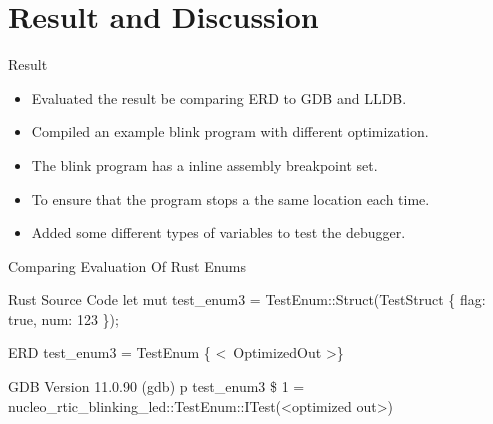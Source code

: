 \section{Result and Discussion}

\begin{frame}{Result}
    \begin{itemize}
        \item Evaluated the result be comparing ERD to GDB and LLDB.
        \item Compiled an example blink program with different optimization.
        \item The blink program has a inline assembly breakpoint set.
        \item To ensure that the program stops a the same location each time.
        \item Added some different types of  variables to test the debugger.
    \end{itemize}
\end{frame}


\begin{frame}{Comparing Evaluation Of Rust Enums}
	\begin{alertblock}{Rust Source Code}
		let mut test\_enum3 = TestEnum::Struct(TestStruct \{ flag: true, num: 123 \});
    	\end{alertblock}

	\begin{block}{ERD}
		test\_enum3 = TestEnum \{ \textless \ OptimizedOut \textgreater \}
    	\end{block}

    	\begin{block}{GDB Version 11.0.90}
		(gdb) p test\_enum3\newline
		\$ 1 = nucleo\_rtic\_blinking\_led::TestEnum::ITest(\textless optimized out\textgreater)
    	\end{block}
\end{frame}


